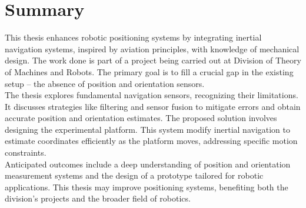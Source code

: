\section{Summary}

This thesis enhances robotic positioning systems by integrating inertial navigation systems, inspired by aviation principles, with knowledge of mechanical design. The work done is part of a project being carried out at Division of Theory of Machines and Robots. The primary goal is to fill a crucial gap in the existing setup – the absence of position and orientation sensors.\\

The thesis explores fundamental navigation sensors, recognizing their limitations. It discusses strategies like filtering and sensor fusion to mitigate errors and obtain accurate position and orientation estimates. The proposed solution involves designing the experimental platform. This system modify inertial navigation to estimate coordinates efficiently as the platform moves, addressing specific motion constraints.\\

Anticipated outcomes include a deep understanding of position and orientation measurement systems and the design of a prototype tailored for robotic applications. This thesis may improve positioning systems, benefiting both the division's projects and the broader field of robotics.